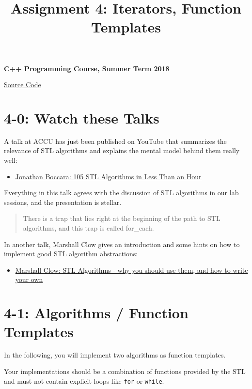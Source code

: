 \documentclass[]{article}
\title{Assignment 4: Iterators, Function Templates}
\date{}
\providecommand{\tightlist}{%
  \setlength{\itemsep}{0pt}\setlength{\parskip}{0pt}}
\begin{document}
\maketitle

\textbf{C++ Programming Course, Summer Term 2018}

\href{/assignment-04/a-04/}{Source Code}

\section{4-0: Watch these Talks}\label{watch-these-talks}

A talk at ACCU has just been published on YouTube that summarizes the
relevance of STL algorithms and explains the mental model behind them
really well:

\begin{itemize}
\tightlist
\item
  \href{https://www.youtube.com/watch?v=bXkWuUe9V2I}{Jonathan Boccara:
  105 STL Algorithms in Less Than an Hour}
\end{itemize}

Everything in this talk agrees with the discussion of STL algorithms in
our lab sessions, and the presentation is stellar.

\begin{quote}
There is a trap that lies right at the beginning of the path to STL
algorithms, and this trap is called for\_each.
\end{quote}

In another talk, Marshall Clow gives an introduction and some hints on
how to implement good STL algorithm abstractions:

\begin{itemize}
\tightlist
\item
  \href{https://www.youtube.com/watch?v=h4Jl1fk3MkQ}{Marshall Clow: STL
  Algorithms - why you should use them, and how to write your own}
\end{itemize}

\section{4-1: Algorithms / Function
Templates}\label{algorithms-function-templates}

In the following, you will implement two algorithms as function
templates.

Your implementations should be a combination of functions provided by
the STL and must not contain explicit loops like \texttt{for} or
\texttt{while}.
\end{document}
